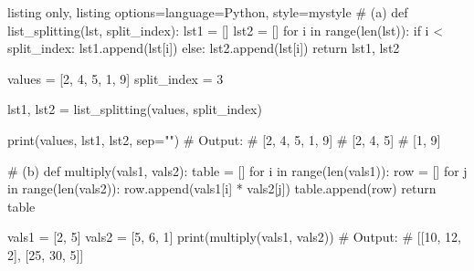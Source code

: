 \documentclass[11pt, oneside]{book}
\begin{document}
\begin{tcblisting}{listing only, listing options={language=Python, style=mystyle}}
# (a)
def list_splitting(lst, split_index):
    lst1 = []
    lst2 = []
    for i in range(len(lst)):
        if i < split_index:
            lst1.append(lst[i])
        else:
            lst2.append(lst[i])
    return lst1, lst2

values = [2, 4, 5, 1, 9] 
split_index = 3

lst1, lst2 = list_splitting(values, split_index)

print(values, lst1, lst2, sep="\n")
# Output:
# [2, 4, 5, 1, 9]
# [2, 4, 5]
# [1, 9]

# (b)
def multiply(vals1, vals2):
    table = []
    for i in range(len(vals1)):
        row = []
        for j in range(len(vals2)):
            row.append(vals1[i] * vals2[j])
        table.append(row)
    return table

vals1 = [2, 5]
vals2 = [5, 6, 1]
print(multiply(vals1, vals2))
# Output:
# [[10, 12, 2], [25, 30, 5]]
\end{tcblisting}

\doclicenseThis
\end{document}
